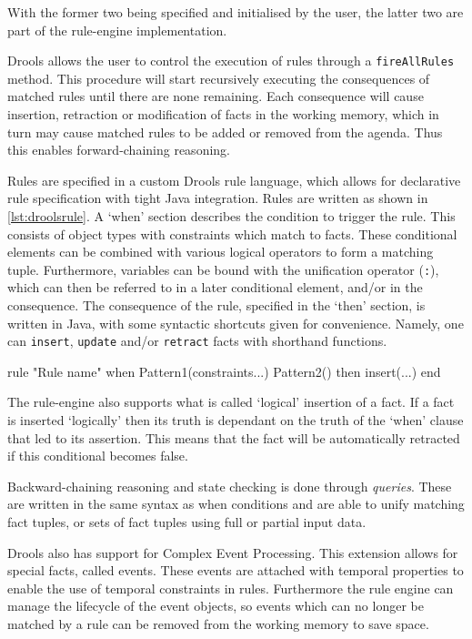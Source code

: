 With the former two being specified and initialised by the user, the latter two
are part of the rule-engine implementation.

Drools allows the user to control the execution of rules through a \texttt{fireAllRules} method.
This procedure will start recursively executing the consequences of matched
rules until there are none remaining. Each consequence will cause insertion,
retraction or modification of facts in the working memory, which in turn may
cause matched rules to be added or removed from the agenda. Thus this enables
forward-chaining reasoning.

Rules are specified in a custom Drools rule language, which allows for
declarative rule specification with tight Java integration. Rules are written as
shown in \autoref{lst:droolsrule}. A `when' section describes the condition
to trigger the rule. This consists of object types with constraints which match
to facts. These conditional elements can be combined with various logical
operators to form a matching tuple. Furthermore, variables can be bound with the
unification operator (\texttt{:}), which can then be referred to in a later
conditional element, and/or in the consequence. The consequence of the rule,
specified in the `then' section, is written in Java, with some syntactic
shortcuts given for convenience. Namely, one can \texttt{insert}, \texttt{update}
and/or \texttt{retract} facts with shorthand functions.

\begin{drools}[label=lst:droolsrule,caption=Syntax of a Drools rule.]
rule "Rule name"
when
	Pattern1(constraints...)
	Pattern2()
then
	insert(...)
end
\end{drools}

The rule-engine also supports what is called `logical' insertion of a fact. If a
fact is inserted `logically' then its truth is dependant on the truth of the
`when' clause that led to its assertion. This means that the fact will be
automatically retracted if this conditional becomes false.

Backward-chaining reasoning and state checking is done through \emph{queries}.
These are written in the same syntax as when conditions and are able to unify
matching fact tuples, or sets of fact tuples using full or partial input data. 

Drools also has support for Complex Event Processing. This extension allows for
special facts, called events. These events are attached with temporal properties
to enable the use of temporal constraints in rules. Furthermore the rule engine
can manage the lifecycle of the event objects, so events which can no longer be
matched by a rule can be removed from the working memory to save space.


